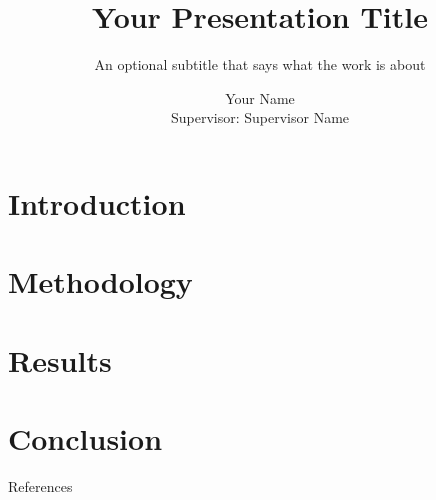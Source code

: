 \documentclass[11pt]{beamer}
\title[Short title]{Your Presentation Title}
\subtitle{An optional subtitle that says what the work is about}
\author[Your Name]{
Your Name\\\vspace{0.15cm}
\small Supervisor: Supervisor Name}
\begin{document}


\section{Introduction}


\section{Methodology}


\section{Results}


\section{Conclusion}


\begin{frame}[allowframebreaks]{References}
\footnotesize


\end{frame}

\begin{frame}
\titlepage
\end{frame}
\end{document}
